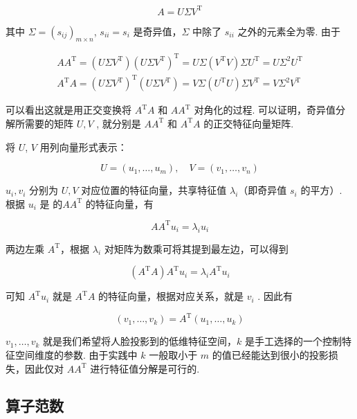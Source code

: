 \[ A = U\Sigma V^{\mathrm{T}} \]

其中 $\Sigma = (s_{ij})_{m\times n}$, $s_{ii}=s_i$ 是奇异值，$\Sigma$ 中除了 $s_{ii}$ 之外的元素全为零. 由于

\begin{gather*}
    AA^{\mathrm{T}} = (U\Sigma V^{\mathrm{T}})(U\Sigma V^{\mathrm{T}})^{\mathrm{T}} = U \Sigma (V^{\mathrm{T}} V) \Sigma U^{\mathrm{T}} = U \Sigma^2 U^{\mathrm{T}} \\
    A^{\mathrm{T}}A = (U\Sigma V^{\mathrm{T}})^{\mathrm{T}}(U\Sigma V^{\mathrm{T}}) = V \Sigma (U^{\mathrm{T}} U) \Sigma V^{\mathrm{T}} = V \Sigma^2 V^{\mathrm{T}}
\end{gather*}

可以看出这就是用正交变换将 $A^{\mathrm{T}}A$ 和 $AA^{\mathrm{T}}$ 对角化的过程. 可以证明，奇异值分解所需要的矩阵 $U, V$ , 就分别是 $AA^{\mathrm{T}}$ 和 $A^{\mathrm{T}}A$ 的正交特征向量矩阵.

将 $U$, $V$ 用列向量形式表示：

\[ U = (u_1, \ldots, u_m), \quad V = (v_1, \ldots, v_n) \]

$u_i, v_i$ 分别为 $U, V$ 对应位置的特征向量，共享特征值 $\lambda_i$（即奇异值 $s_i$ 的平方）. 根据 $u_i$ 是 的$AA^{\mathrm{T}}$ 的特征向量，有

\[ AA^{\mathrm{T}} u_i = \lambda_i u_i \]

两边左乘 $A^{\mathrm{T}}$，根据 $\lambda_i$ 对矩阵为数乘可将其提到最左边，可以得到

\[ (A^{\mathrm{T}}A)A^{\mathrm{T}} u_i = \lambda_i A^{\mathrm{T}} u_i \]

可知 $A^{\mathrm{T}} u_i$ 就是 $A^{\mathrm{T}}A$ 的特征向量，根据对应关系，就是 $v_i$ . 因此有

\[ (v_1, \ldots, v_k) = A^{\mathrm{T}}(u_1, \ldots, u_k) \]

$v_1, \ldots, v_k$ 就是我们希望将人脸投影到的低维特征空间，$k$ 是手工选择的一个控制特征空间维度的参数. 由于实践中 $k$ 一般取小于 $m$ 的值已经能达到很小的投影损失，因此仅对 $AA^{\mathrm{T}}$ 进行特征值分解是可行的.


\subsection*{算子范数}

\begin{summary}

\end{summary}

\begin{exercise}

    \begin{exgroup}
        \item
    \end{exgroup}

    \begin{exgroup}
        \item
    \end{exgroup}

    \begin{exgroup}
        \item
    \end{exgroup}
\end{exercise}
